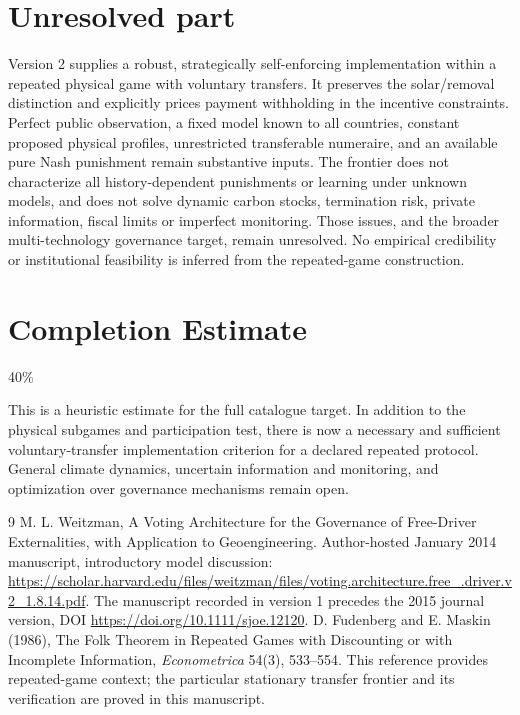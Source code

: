 \documentclass[11pt]{article}
\theoremstyle{definition}
\begin{document}
\section*{Unresolved part}
Version 2 supplies a robust, strategically self-enforcing implementation
within a repeated physical game with voluntary transfers. It preserves the
solar/removal distinction and explicitly prices payment withholding in the
incentive constraints. Perfect public observation, a fixed model known to
all countries, constant proposed physical profiles, unrestricted transferable
numeraire, and an available pure Nash punishment remain substantive inputs.
The frontier does not characterize all history-dependent punishments or
learning under unknown models, and does not solve dynamic carbon stocks,
termination risk, private information, fiscal limits or imperfect monitoring.
Those issues, and the broader multi-technology governance target, remain
unresolved. No empirical credibility or institutional feasibility is inferred
from the repeated-game construction.
\section{Completion Estimate}
40\%

This is a heuristic estimate for the full catalogue target. In addition to
the physical subgames and participation test, there is now a necessary and
sufficient voluntary-transfer implementation criterion for a declared
repeated protocol. General climate dynamics, uncertain information and
monitoring, and optimization over governance mechanisms remain open.

\begin{thebibliography}{9}
 M. L. Weitzman, A Voting Architecture for the Governance of Free-Driver Externalities, with Application to Geoengineering. Author-hosted January 2014 manuscript, introductory model discussion: \url{https://scholar.harvard.edu/files/weitzman/files/voting.architecture.free_.driver.v2_1.8.14.pdf}. The manuscript recorded in version 1 precedes the 2015 journal version, DOI \url{https://doi.org/10.1111/sjoe.12120}.
 D. Fudenberg and E. Maskin (1986), The Folk Theorem
in Repeated Games with Discounting or with Incomplete Information,
\emph{Econometrica} 54(3), 533--554. This reference provides repeated-game
context; the particular stationary transfer frontier and its verification
are proved in this manuscript.
\end{thebibliography}
\end{document}
